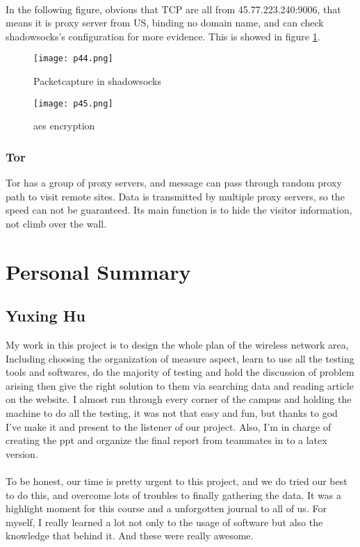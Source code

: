 \documentclass[paper=a4, fontsize=11pt]{scrartcl}
\numberwithin{equation}{section}
\numberwithin{figure}{section}
\numberwithin{table}{section}
\begin{document}
\paragraph{} 
In the following figure, obvious that TCP are all from 45.77.223.240:9006, that means it is proxy server from US, binding no domain name, and can check shadowsocks's configuration for more evidence. This is showed in figure \ref{p44}.
\begin{figure}[!htb]
\centering
\texttt{[image: p44.png]}
\caption{Packetcapture in shadowsocks}
\label{p44}
\end{figure}

\begin{figure}[!htb]
\centering
\texttt{[image: p45.png]}
\caption{aes encryption}
\label{p45}
\end{figure}
\subsubsection{Tor}
Tor has a group of proxy servers, and message can pass through random proxy path to visit remote sites.\cite{cn7} Data is transmitted by multiple proxy servers, so the speed can not be guaranteed. Its main function is to hide the visitor information, not climb over the wall.
\section{Personal Summary}
\subsection{Yuxing Hu}
My work in this project is to design the whole plan of the wireless network area, Including choosing the organization of measure aspect, learn to use all the testing tools and softwares, do the majority of testing and hold the discussion of problem arising then give the right solution to them via searching data and reading article on the website. I almost run through every corner of the campus and holding the machine to do all the testing, it was not that easy and fun, but thanks to god I've make it and present to the listener of our project. Also, I'm in charge of creating the ppt and organize the final report from teammates in to a latex version.
\paragraph{} 
To be honest, our time is pretty urgent to this project, and we do tried our best to do this, and overcome lots of troubles to finally gathering the data. It was a highlight moment for this course and a unforgotten journal to all of us. For myself, I really learned a lot not only to the usage of software but also the knowledge that behind it. And these were really awesome.
\end{document}

